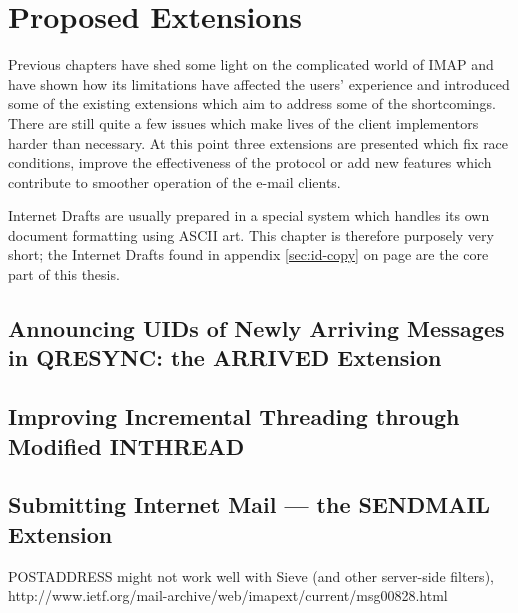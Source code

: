 \documentclass[trojita]{subfiles}
\begin{document}
\chapter{Proposed Extensions}

Previous chapters have shed some light on the complicated world of IMAP and have shown how its limitations have
affected the users' experience and introduced some of the existing extensions which aim to address some of the
shortcomings.  There are still quite a few issues which make lives of the client implementors harder than necessary.  At
this point three extensions are presented which fix race conditions, improve the effectiveness of the protocol or add new
features which contribute to smoother operation of the e-mail clients.

Internet Drafts are usually prepared in a special system which handles its own document formatting using ASCII art.
This chapter is therefore purposely very short; the Internet Drafts found in appendix \ref{sec:id-copy} on page
\pageref{sec:id-copy} are the core part of this thesis.

\section{Announcing UIDs of Newly Arriving Messages in QRESYNC: the ARRIVED Extension}
\label{sec:draft-arrived}

\section{Improving Incremental Threading through Modified INTHREAD}
\label{sec:draft-inthread-ext}

\section{Submitting Internet Mail --- the SENDMAIL Extension}
\label{sec:draft-sendmail}

POSTADDRESS might not work well with Sieve (and other server-side filters),
http://www.ietf.org/mail-archive/web/imapext/current/msg00828.html
\end{document}
